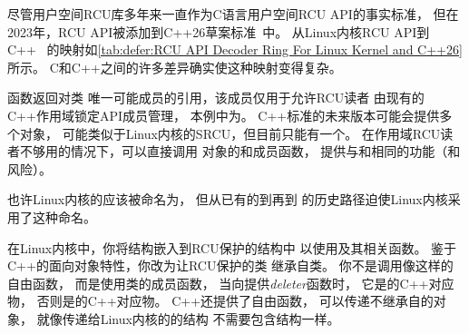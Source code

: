 \begin{table}
\renewcommand*{\arraystretch}{1.15}
\footnotesize
\centering\OneColumnHSpace{-.4in}
\caption{Linux内核与C++26的RCU API对照表}
\label{tab:defer:RCU API Decoder Ring For Linux Kernel and C++26}
\end{table}

尽管用户空间RCU库多年来一直作为C语言用户空间RCU API的事实标准，
但在2023年，RCU API被添加到C++26草案标准~\cite{PaulEMcKennney2023C++26RCU4,ThomasKoeppe2025N5032}中。
从Linux内核RCU API到C++~\cite{PaulEMcKenney2023P0124R8-LKMM,PaulEMcKenney2026cppRCU}
的映射如\cref{tab:defer:RCU API Decoder Ring For Linux Kernel and C++26}所示。
C和C++之间的许多差异确实使这种映射变得复杂。

函数返回对类
唯一可能成员的引用，该成员仅用于允许RCU读者
由现有的C++作用域锁定API成员管理，
本例中为。
C++标准的未来版本可能会提供多个对象，
可能类似于Linux内核的SRCU，但目前只能有一个。
在作用域RCU读者不够用的情况下，可以直接调用
对象的和成员函数，
提供与和相同的功能（和风险）。

也许Linux内核的应该被命名为，
但从已有的到再到
的历史路径迫使Linux内核采用了这种命名。

在Linux内核中，你将结构嵌入到RCU保护的结构中
以使用及其相关函数。
鉴于C++的面向对象特性，你改为让RCU保护的类
继承自类。
你不是调用像这样的自由函数，
而是使用类的成员函数，
当向提供\emph{deleter}函数时，
它是的C++对应物，
否则是的C++对应物。
C++还提供了自由函数，
可以传递不继承自的对象，
就像传递给Linux内核的的结构
不需要包含结构一样。

